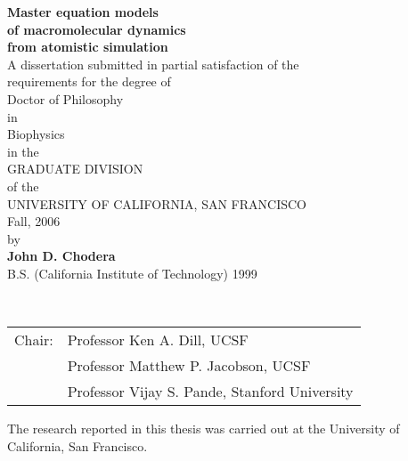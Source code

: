 %
%



\pagestyle{empty}



\begin{center}
\vspace*{15mm}
{
  \Huge \sffamily \bfseries Master equation models\\ of macromolecular dynamics\\ from atomistic simulation\\[4mm]
}
\vspace*{2.5cm}
{
\large 
\vspace*{1.0cm}
A dissertation submitted in partial satisfaction of the \\
requirements for the degree of \\
Doctor of Philosophy \\
in \\
Biophysics \\
in the \\
GRADUATE DIVISION \\
of the \\
UNIVERSITY OF CALIFORNIA, SAN FRANCISCO \\[5mm]
Fall, 2006 \\
\vspace*{2.5cm}
by \\[5mm]
{\sffamily \bfseries John D. Chodera} \\[5mm]
B.S. (California Institute of Technology) 1999
}
\end{center}



\clearpage

 \\

\begin{tabular}{ll}
Chair: & Professor Ken A. Dill, UCSF \\
~ & Professor Matthew P. Jacobson, UCSF \\
~ & Professor Vijay S. Pande, Stanford University
\end{tabular}

\vspace*{0.5cm}

 
\noindent
The research reported in this thesis was carried out at the University of California, San Francisco.


\cleardoublepage
\pagestyle{fancy}

